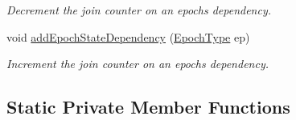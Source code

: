 \begin{DoxyCompactItemize}
\begin{DoxyCompactList}\small\item\em Decrement the join counter on an epoch\textquotesingle{}s dependency. \end{DoxyCompactList}\item 
void \hyperlink{structvt_1_1term_1_1_termination_detector_ac0c59133b2db32f599aa4b5f8f451fe0}{add\+Epoch\+State\+Dependency} (\hyperlink{namespacevt_a81d11b28122d43bf9834577e4a06440f}{Epoch\+Type} ep)
\begin{DoxyCompactList}\small\item\em Increment the join counter on an epoch\textquotesingle{}s dependency. \end{DoxyCompactList}\end{DoxyCompactItemize}
\subsection*{Static Private Member Functions}
